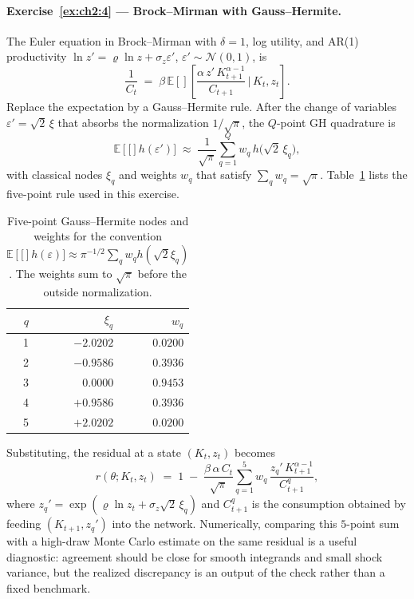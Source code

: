 \documentclass[11pt,a4paper]{report}
\newcommand{\E}[1]{\mathbb{E}\!\left[#1\right]}
\begin{document}
\paragraph{Exercise~\ref{ex:ch2:4} --- Brock--Mirman with Gauss--Hermite.}
The Euler equation in Brock--Mirman with $\delta = 1$, log utility, and AR(1) productivity $\ln z' = \varrho\ln z + \sigma_z\varepsilon'$, $\varepsilon' \sim \mathcal{N}(0,1)$, is
\[
   \frac{1}{C_t}
   \;=\;
   \beta\,\E\!\left[\frac{\alpha\,z'\,K_{t+1}^{\alpha - 1}}{C_{t+1}} \,\Big|\, K_t, z_t\right].
\]
Replace the expectation by a Gauss--Hermite rule.  After the change of variables $\varepsilon' = \sqrt{2}\,\xi$ that absorbs the normalization $1/\sqrt{\pi}$, the $Q$-point GH quadrature is
\[
   \E[h(\varepsilon')] \;\approx\; \frac{1}{\sqrt{\pi}} \sum_{q=1}^{Q} w_q\,h\!\bigl(\sqrt{2}\,\xi_q\bigr),
\]
with classical nodes $\xi_q$ and weights $w_q$ that satisfy $\sum_q w_q = \sqrt{\pi}$.  Table~\ref{tab:gh5_nodes} lists the five-point rule used in this exercise.
\begin{table}[ht]
\centering
\small
\caption{Five-point Gauss--Hermite nodes and weights for the convention $\E[h(\varepsilon)] \approx \pi^{-1/2}\sum_q w_q h(\sqrt{2}\xi_q)$.  The weights sum to $\sqrt{\pi}$ before the outside normalization.}
\label{tab:gh5_nodes}
\begin{tabular}{@{}rrr@{}}
\toprule
$q$ & $\xi_q$ & $w_q$ \\\midrule
1 & $-2.0202$ & $0.0200$ \\
2 & $-0.9586$ & $0.3936$ \\
3 & $0.0000$ & $0.9453$ \\
4 & $+0.9586$ & $0.3936$ \\
5 & $+2.0202$ & $0.0200$ \\
\bottomrule
\end{tabular}
\end{table}
Substituting, the residual at a state $(K_t, z_t)$ becomes
\[
   r(\theta; K_t, z_t)
   \;=\;
   1 \;-\; \frac{\beta\,\alpha\,C_t}{\sqrt{\pi}}\sum_{q=1}^{5} w_q\,\frac{z_q'\,K_{t+1}^{\alpha-1}}{C_{t+1}^{q}},
\]
where $z_q' = \exp(\varrho\ln z_t + \sigma_z\sqrt{2}\,\xi_q)$ and $C_{t+1}^q$ is the consumption obtained by feeding $(K_{t+1}, z_q')$ into the network.  Numerically, comparing this $5$-point sum with a high-draw Monte Carlo estimate on the same residual is a useful diagnostic: agreement should be close for smooth integrands and small shock variance, but the realized discrepancy is an output of the check rather than a fixed benchmark.
\end{document}
